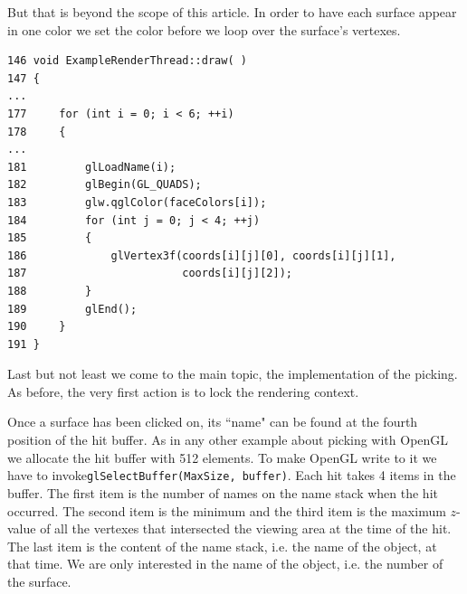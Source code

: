 \documentclass[prodmode,acmtopc]{acmsmall}
\begin{document}
%
But that is beyond the scope of this article.
%
In order to have each surface appear in one color we set the color before we loop over the surface's vertexes.
\begin{lstlisting}
146 void ExampleRenderThread::draw( )
147 {
...
177     for (int i = 0; i < 6; ++i)
178     {
...
181         glLoadName(i);
182         glBegin(GL_QUADS);
183         glw.qglColor(faceColors[i]);
184         for (int j = 0; j < 4; ++j)
185         {
186             glVertex3f(coords[i][j][0], coords[i][j][1],
187                        coords[i][j][2]);
188         }
189         glEnd();
190     }
191 }
\end{lstlisting}
%
Last but not least we come to the main topic, the implementation of the picking.
%
As before, the very first action is to lock the rendering context.

Once a surface has been clicked on, its ``name" can be found at the fourth position of the hit buffer.
%
As in any other example about picking with OpenGL we allocate the hit buffer with 512 elements. 
%
To make OpenGL write to it we have to invoke\lstinline|glSelectBuffer(MaxSize, buffer)|.
 Each hit takes 4 items in the buffer.
%
 The first item is the number of names on the name stack when the hit occurred.
%
 The second item is the minimum and the third item is the maximum $z$-value of all the vertexes that intersected
 the viewing area at the time of the hit. 
 The last item is the content of the name stack, i.e. the name of the object, at that time. 
% 
 We are only interested in the name of the object, i.e. the number of the surface.
 
\end{document}

